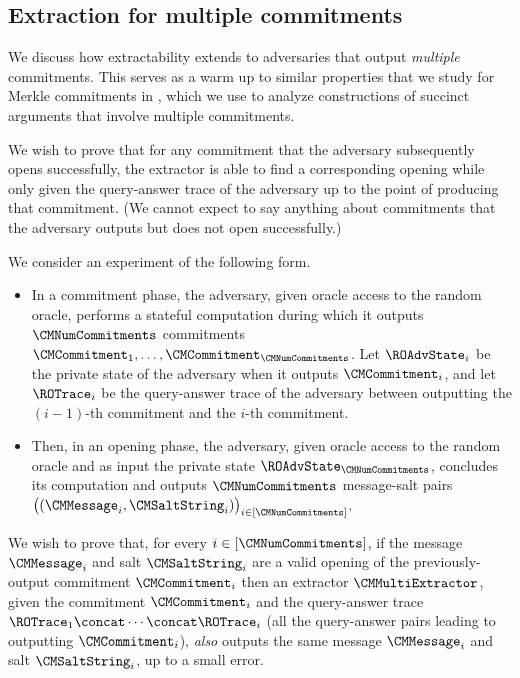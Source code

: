\subsection{Extraction for multiple commitments}
\label{section:basic-commitment-multi-extractability}

We discuss how extractability extends to adversaries that output \emph{multiple} commitments. This serves as a warm up to similar properties that we study for Merkle commitments in , which we use to analyze constructions of succinct arguments that involve multiple commitments.

We wish to prove that for any commitment that the adversary subsequently opens successfully, the extractor is able to find a corresponding opening while only given the query-answer trace of the adversary up to the point of producing that commitment. (We cannot expect to say anything about commitments that the adversary outputs but does not open successfully.)

We consider an experiment of the following form.
\begin{itemize}

  \item In a commitment phase, the adversary, given oracle access to the random oracle, performs a stateful computation during which it outputs $\CMNumCommitments$ commitments $\CMCommitment_{1},\dots,\CMCommitment_{\CMNumCommitments}$. Let $\ROAdvState_{i}$ be the private state of the adversary when it outputs $\CMCommitment_{i}$, and let $\ROTrace_{i}$ be the query-answer trace of the adversary between outputting the $(i-1)$-th commitment and the $i$-th commitment.

  \item Then, in an opening phase, the adversary, given oracle access to the random oracle and as input the private state $\ROAdvState_{\CMNumCommitments}$, concludes its computation and outputs $\CMNumCommitments$ message-salt pairs $\big((\CMMessage_{i},\CMSaltString_{i})\big)_{i \in [\CMNumCommitments]}$.

\end{itemize}
We wish to prove that, for every $i \in [\CMNumCommitments]$, if the message $\CMMessage_{i}$ and salt $\CMSaltString_{i}$ are a valid opening of the previously-output commitment $\CMCommitment_{i}$ then an extractor $\CMMultiExtractor$, given the commitment $\CMCommitment_{i}$ and the query-answer trace $\ROTrace_{1} \concat \cdots \concat \ROTrace_{i}$ (all the query-answer pairs leading to outputting $\CMCommitment_{i}$), \emph{also} outputs the same message $\CMMessage_{i}$ and salt $\CMSaltString_{i}$, up to a small error.

